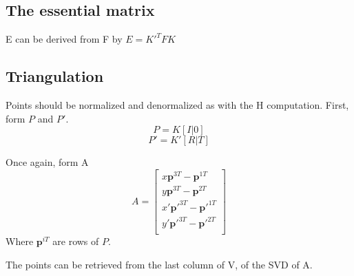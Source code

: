 \subsection{The essential matrix}

E can be derived from F by \( E = K'^T F K \)

\subsection{Triangulation}

Points should be normalized and denormalized as with the H computation.
First, form \(P\) and \(P'\).
\[
    P = K[I | 0]
\]
\[
    P' = K'[R | T]
\]

Once again, form A 
\[
    A = \begin{bmatrix}
        x \boldsymbol{p}^{3T} - \boldsymbol{p}^{1T} \\
        y \boldsymbol{p}^{3T} - \boldsymbol{p}^{2T} \\

        x' \boldsymbol{p}'^{3T} - \boldsymbol{p}'^{1T} \\
        y' \boldsymbol{p}'^{3T} - \boldsymbol{p}'^{2T} \\
    \end{bmatrix}
\]
Where \( \boldsymbol{p}^{iT} \) are rows of \(P\).

The points can be retrieved from the last column of V, of the SVD of A.
































